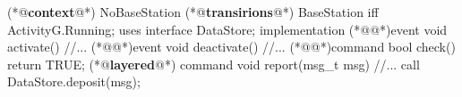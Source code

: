 \begin{Sbox}
\begin{minipage}{\columnwidth}
\begin{csource}
(*@\textbf{context}@*) NoBaseStation {
 (*@\textbf{transirions}@*) BaseStation iff ActivityG.Running;
  uses interface DataStore;
}implementation {
 (*@@*)event void activate(){
  //...}
 (*@@*)event void deactivate(){
  //...}
 (*@@*)command bool check(){
  return TRUE;}
 (*@\textbf{layered}@*) command void report(msg_t msg){
  //...
  call DataStore.deposit(msg);}}
\end{csource}
\end{minipage}
\end{Sbox}